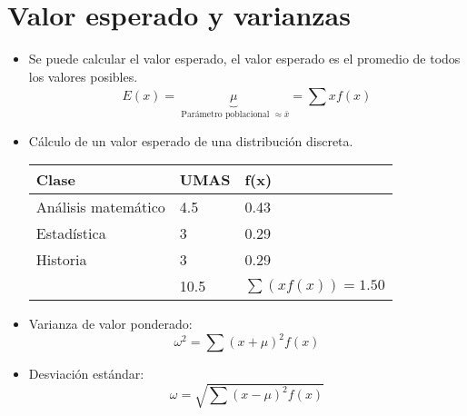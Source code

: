 \section{Valor esperado y varianzas}
\begin{itemize}
    \item Se puede calcular el valor esperado, el valor esperado es el promedio de todos los valores posibles.
        \[
            E(x)= \underbrace{\mu}_{\text{  Parámetro poblacional  } \approx \bar{x}} = \sum_{}^{}xf(x)
        \]
    
    \item Cálculo de un valor esperado de una distribución discreta.
        \begin{center}
           \begin{tabular}{ | p{5cm} | p{5cm} | p{5cm} | }
               \hline
                   Clase & UMAS & f(x) \\
               \hline
                    Análisis matemático & 4.5 & 0.43 \\ 
                    Estadística         &  3  & 0.29 \\ 
                    Historia            & 3   & 0.29 \\ 
                \hline
                    & 10.5 & $\sum (xf(x))=1.50$ \\ 
                \hline
           \end{tabular}
        \end{center}
    
    \item Varianza de valor ponderado:
        \[
          \omega^2 = \sum (x+\mu)^2f(x)
        \]
    
    \item Desviación estándar:
        \[
          \omega = \sqrt{\sum (x - \mu )^2 f(x)}
        \]
\end{itemize}


